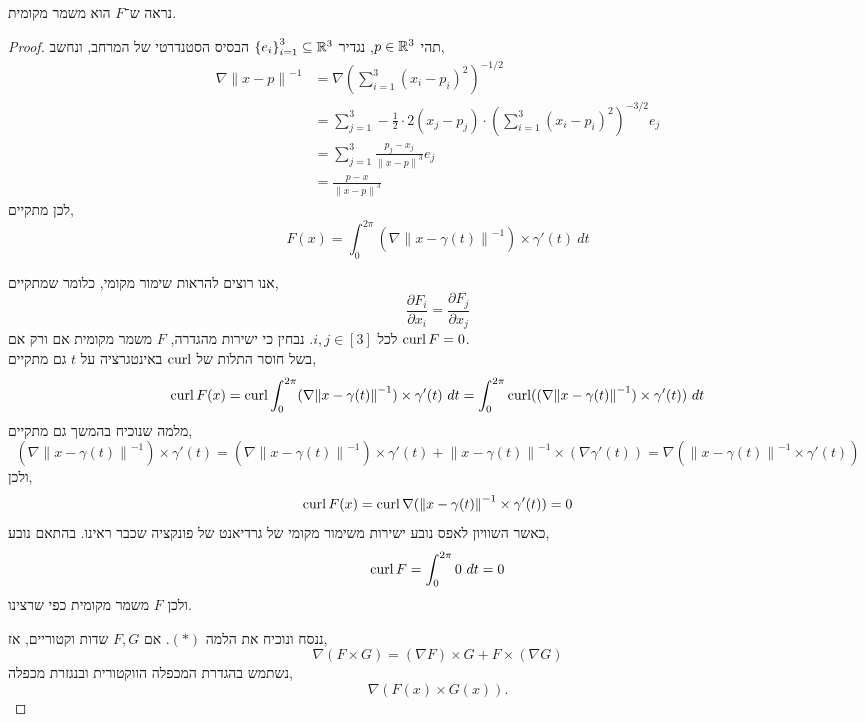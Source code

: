 \subquestion{}
נראה ש־$F$ הוא משמר מקומית.
\begin{proof}
	תהי $p \in \mathbb{R}^3$, נגדיר ${\{ e_i \}}_{i = 1}^3 \subseteq \mathbb{R}^3$ הבסיס הסטנדרטי של המרחב, ונחשב,
	\begin{align*}
		\nabla {\lVert x - p \rVert}^{-1}
		& = \nabla {\left(\sum_{i = 1}^3 {(x_i - p_i)}^2 \right)}^{-1/2} \\
		& = \sum_{j = 1}^3 - \frac{1}{2} \cdot 2 (x_j - p_j) \cdot {\left(\sum_{i = 1}^3 {(x_i - p_i)}^2 \right)}^{-3/2} e_j \\
		& = \sum_{j = 1}^3 \frac{p_j - x_j}{{\lVert x - p \rVert}^3} e_j \\
		& = \frac{p - x}{{\lVert x - p \rVert}^3}
	\end{align*}
	לכן מתקיים,
	\[
		F(x)
		= \int_{0}^{2 \pi} (\nabla {\lVert x - \gamma(t) \rVert}^{-1}) \times \gamma'(t)\ dt
	\]

	אנו רוצים להראות שימור מקומי, כלומר שמתקיים,
	\[
		\frac{\partial F_i}{\partial x_i}
		= \frac{\partial F_j}{\partial x_j}
	\]
	לכל $i, j \in [3]$.
	נבחין כי ישירות מהגדרה, $F$ משמר מקומית אם ורק אם $\operatorname{curl} F = 0$. \\
	בשל חוסר התלות של $\operatorname{curl}$ באינטגרציה על $t$ גם מתקיים,
	\[
		\operatorname{curl} F(x)
		= \operatorname{curl} \int_{0}^{2 \pi} (\nabla {\lVert x - \gamma(t) \rVert}^{-1}) \times \gamma'(t)\ dt
		= \int_{0}^{2 \pi} \operatorname{curl}((\nabla {\lVert x - \gamma(t) \rVert}^{-1}) \times \gamma'(t))\ dt
	\]
	מלמה שנוכיח בהמשך גם מתקיים,
	\[
		(\nabla {\lVert x - \gamma(t) \rVert}^{-1}) \times \gamma'(t)
		= (\nabla {\lVert x - \gamma(t) \rVert}^{-1}) \times \gamma'(t) + {\lVert x - \gamma(t) \rVert}^{-1} \times (\nabla \gamma'(t))
		= \nabla ({\lVert x - \gamma(t) \rVert}^{-1} \times \gamma'(t))
	\]
	ולכן,
	\[
		\operatorname{curl} F(x)
		= \operatorname{curl} \nabla ({\lVert x - \gamma(t) \rVert}^{-1} \times \gamma'(t))
		= 0
	\]
	כאשר השוויון לאפס נובע ישירות משימור מקומי של גרדיאנט של פונקציה שכבר ראינו.
	בהתאם נובע,
	\[
		\operatorname{curl} F
		= \int_{0}^{2 \pi} 0\ dt
		= 0
	\]
	ולכן $F$ משמר מקומית כפי שרצינו.

	ננסח ונוכיח את הלמה $(*)$.
	אם $F, G$ שדות וקטוריים, אז,
	\[
		\nabla (F \times G)
		= (\nabla F) \times G + F \times (\nabla G)
	\]
	נשתמש בהגדרת המכפלה הווקטורית ובנגזרת מכפלה,
	\[
		\nabla (F(x) \times G(x))
	.\]


\end{proof}
